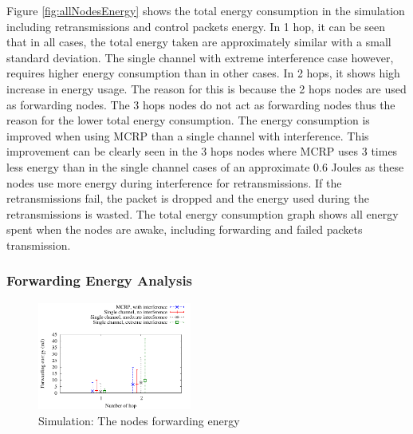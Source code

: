 Figure \ref{fig:allNodesEnergy} shows the total energy consumption in the simulation including retransmissions and control packets energy. 
In 1 hop, it can be seen that in all cases, the total energy taken are approximately similar with a small standard deviation. The single channel with extreme interference case however, requires higher energy consumption than in other cases.
In 2 hops, it shows high increase in energy usage. The reason for this is because the 2 hops nodes are used as forwarding nodes. The 3 hops nodes do not act as forwarding nodes thus the reason for the lower total energy consumption.
The energy consumption is improved when using MCRP than a single channel with interference. This improvement can be clearly seen in the 3 hops nodes where MCRP uses 3 times less energy than in the single channel cases of an approximate 0.6 Joules as these nodes use more energy during interference for retransmissions. If the retransmissions fail, the packet is dropped and the energy used during the retransmissions is wasted. The total energy consumption graph shows all energy spent when the nodes are awake, including forwarding and failed packets transmission.

\subsubsection{Forwarding Energy Analysis}

\begin{figure}
\centering
\includegraphics[width=0.45\textwidth]{figures/fwdEnergy.pdf}
\caption{Simulation: The nodes forwarding energy}
\label{fig:allNodesFwdEnergy}
\end{figure}

